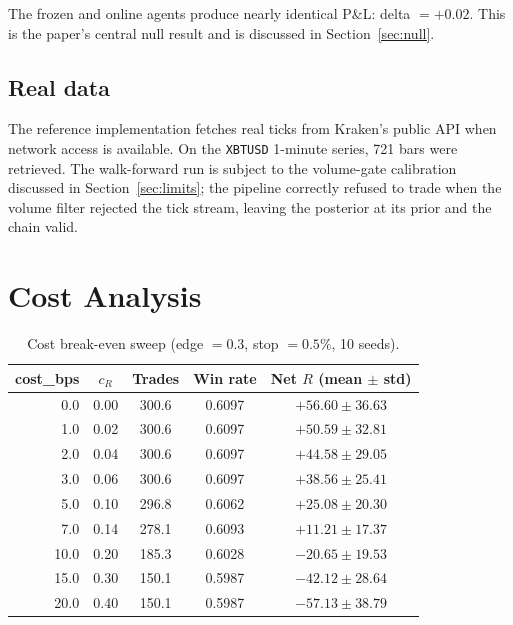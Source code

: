 \documentclass[11pt,a4paper]{article}
\newcommand{\gld}[1]{\textcolor{goldshiny}{#1}}
\newcommand{\cel}[1]{\textcolor{celadon}{#1}}
\theoremstyle{definition}
\begin{document}
The frozen and online agents produce nearly identical P\&L: delta $= +0.02$. This is the paper's central null result and is discussed in Section~\ref{sec:null}.

\subsection{Real data}

The reference implementation fetches real ticks from Kraken's public API when network access is available. On the \texttt{XBTUSD} 1-minute series, 721 bars were retrieved. The walk-forward run is subject to the volume-gate calibration discussed in Section~\ref{sec:limits}; the pipeline correctly refused to trade when the volume filter rejected the tick stream, leaving the posterior at its prior and the chain valid.

\section{Cost Analysis}
\label{sec:costs}

\begin{table}[ht]
\centering
\caption{Cost break-even sweep (edge $=0.3$, stop $=0.5\%$, 10 seeds).}
\label{tab:costs}
\renewcommand{\arraystretch}{1.15}
\begin{tabular}{rcccc}
\toprule
\gld{cost\_bps} & \gld{$c_R$} & \gld{Trades} & \gld{Win rate} & \gld{Net $R$ (mean $\pm$ std)} \\
\midrule
0.0  & 0.00 & 300.6 & 0.6097 & $+56.60 \pm 36.63$ \\
1.0  & 0.02 & 300.6 & 0.6097 & $+50.59 \pm 32.81$ \\
2.0  & 0.04 & 300.6 & 0.6097 & $+44.58 \pm 29.05$ \\
3.0  & 0.06 & 300.6 & 0.6097 & $+38.56 \pm 25.41$ \\
5.0  & 0.10 & 296.8 & 0.6062 & $+25.08 \pm 20.30$ \\
7.0  & 0.14 & 278.1 & 0.6093 & \cel{$+11.21 \pm 17.37$} \\
10.0 & 0.20 & 185.3 & 0.6028 & $-20.65 \pm 19.53$ \\
15.0 & 0.30 & 150.1 & 0.5987 & $-42.12 \pm 28.64$ \\
20.0 & 0.40 & 150.1 & 0.5987 & $-57.13 \pm 38.79$ \\
\bottomrule
\end{tabular}
\end{table}
\end{document}
